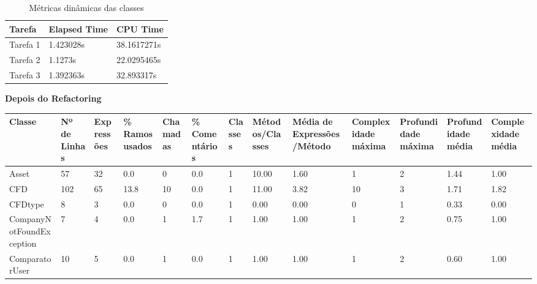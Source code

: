 \begin{table}[]
\centering
\begin{tabular}{|l|l|l|}
\hline
Tarefa   & Elapsed Time & CPU Time    \\ \hline
Tarefa 1 & 1.423028s    & 38.1617271s \\ \hline
Tarefa 2 & 1.1273s    & 22.0295465s \\ \hline
Tarefa 3 & 1.392363s    & 32.893317s \\ \hline
\end{tabular}
\caption{Métricas dinâmicas das classes}
\end{table}

\textbf{Depois do Refactoring}

\begin{table}[ht]
\centering
\begin{adjustbox}{width=1\textwidth}
\small
\begin{tabular}{|l|l|l|l|l|l|l|l|l|l|l|l|l|}
\hline
Classe                       & Nº de Linhas & Expressões & \% Ramos usados & Chamadas & \% Comentários & Classes & Métodos/Classes & Média de Expressões/Método & Complexidade máxima & Profundidade máxima & Profundidade média & Complexidade média \\ \hline
Asset                        & 57           & 32         & 0.0             & 0        & 0.0            & 1       & 10.00           & 1.60                       & 1                   & 2                   & 1.44               & 1.00               \\ \hline
CFD                          & 102          & 65         & 13.8            & 10       & 0.0            & 1       & 11.00           & 3.82                       & 10                  & 3                   & 1.71               & 1.82               \\ \hline
CFDtype                      & 8            & 3          & 0.0             & 0        & 0.0            & 1       & 0.00            & 0.00                       & 0                   & 1                   & 0.33               & 0.00               \\ \hline
CompanyNotFoundException     & 7            & 4          & 0.0             & 1        & 1.7            & 1       & 1.00            & 1.00                       & 1                   & 2                   & 0.75               & 1.00               \\ \hline
ComparatorUser               & 10           & 5          & 0.0             & 1        & 0.0            & 1       & 1.00            & 1.00                       & 1                   & 2                   & 0.60               & 1.00               \\ \hline

\end{tabular}
\end{adjustbox}
\end{table}
